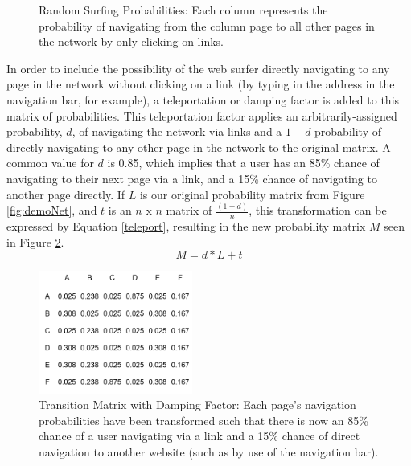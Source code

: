 \documentclass[]{report}   %
\begin{document}
\begin{figure}[h]
\begin{minipage}[t]{0.48\textwidth}
        \caption{Random Surfing Probabilities: Each column represents the probability of navigating from the column page to all other pages in the network by only clicking on links.}
	  \label{fig:demoProb}
    \end{minipage}
\end{figure}
\FloatBarrier

In order to include the possibility of the web surfer directly navigating to any page in the network without clicking on a link (by typing in the address in the navigation bar, for example), a teleportation or damping factor is added to this matrix of probabilities. This teleportation factor applies an arbitrarily-assigned probability, $d$, of navigating the network via links and a $1-d$ probability of directly navigating to any other page in the network to the original matrix. A common value for $d$ is 0.85, which implies that a user has an 85\% chance of navigating to their next page via a link, and a 15\% chance of navigating to another page directly. If $L$ is our original probability matrix from Figure \ref{fig:demoNet}, and $t$ is an $n$ x $n$ matrix of $\frac{(1-d)}{n}$, this transformation can be expressed by Equation \ref{teleport}, resulting in the new probability matrix $M$ seen in Figure \ref{fig:demoDamp}.
\begin{equation}
\label{teleport}
M=d*L+t
\end{equation}

\begin{figure}[h]
    \centering
    \begin{minipage}{0.9\textwidth}
	\captionsetup{font=scriptsize}
        \centering
        \includegraphics[width=0.45\textwidth]{Marbut_DemoWDamping.png} %
        \caption{Transition Matrix with Damping Factor: Each page's navigation probabilities have been transformed such that there is now an 85\% chance of a user navigating via a link and a 15\% chance of direct navigation to another website (such as by use of the navigation bar).}
	  \label{fig:demoDamp}
    \end{minipage}
 \end{figure}
\FloatBarrier 
\end{document}
